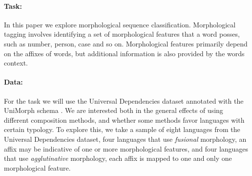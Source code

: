 \documentclass[11pt]{article}
\begin{document}
	
    
    
    
    \paragraph{Task:} In this paper we explore morphological sequence classification. Morphological tagging involves identifying a set of morphological features that a word posses, such as number, person, case and so on. 
    Morphological features primarily depend on the affixes of words, but additional information is also provided by the words context. 
    
    \paragraph{Data:} For the task we will use the Universal Dependencies dataset \citep{nivre2018} annotated with the UniMorph schema \citep{mccarthy2018marrying}. We are interested both in the general effects of using different composition methods, and whether some methods favor languages with certain typology. To explore this, we take a sample of eight languages from the Universal Dependencies dataset, four languages that use \textit{fusional} morphology, an affix may be indicative of one or more morphological features, and four languages that use \textit{agglutinative} morphology, each affix is mapped to one and only one morphological feature. 
    
\end{document}
